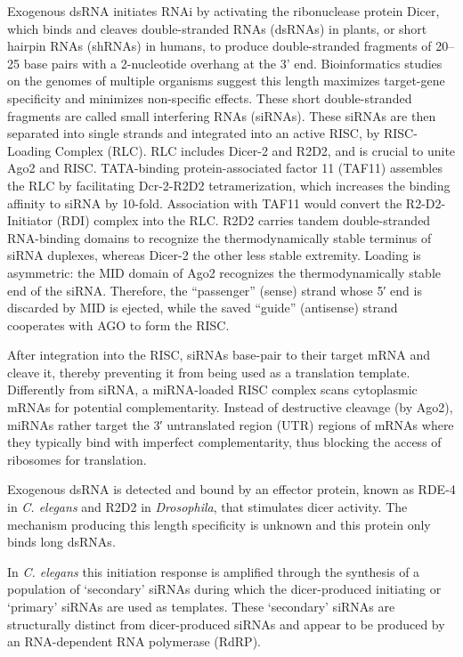 Exogenous dsRNA initiates RNAi by activating the ribonuclease protein Dicer, which binds and cleaves double-stranded RNAs (dsRNAs) in plants, or short hairpin RNAs (shRNAs) in humans, to produce double-stranded fragments of 20--25 base pairs with a 2-nucleotide overhang at the 3' end. Bioinformatics studies on the genomes of multiple organisms suggest this length maximizes target-gene specificity and minimizes non-specific effects. These short double-stranded fragments are called small interfering RNAs (siRNAs). These siRNAs are then separated into single strands and integrated into an active RISC, by RISC-Loading Complex (RLC). RLC includes Dicer-2 and R2D2, and is crucial to unite Ago2 and RISC. TATA-binding protein-associated factor 11 (TAF11) assembles the RLC by facilitating Dcr-2-R2D2 tetramerization, which increases the binding affinity to siRNA by 10-fold. Association with TAF11 would convert the R2-D2-Initiator (RDI) complex into the RLC. R2D2 carries tandem double-stranded RNA-binding domains to recognize the thermodynamically stable terminus of siRNA duplexes, whereas Dicer-2 the other less stable extremity. Loading is asymmetric: the MID domain of Ago2 recognizes the thermodynamically stable end of the siRNA. Therefore, the ``passenger'' (sense) strand whose 5′ end is discarded by MID is ejected, while the saved ``guide'' (antisense) strand cooperates with AGO to form the RISC.

After integration into the RISC, siRNAs base-pair to their target mRNA and cleave it, thereby preventing it from being used as a translation template. Differently from siRNA, a miRNA-loaded RISC complex scans cytoplasmic mRNAs for potential complementarity. Instead of destructive cleavage (by Ago2), miRNAs rather target the 3′ untranslated region (UTR) regions of mRNAs where they typically bind with imperfect complementarity, thus blocking the access of ribosomes for translation.

Exogenous dsRNA is detected and bound by an effector protein, known as RDE-4 in \emph{C. elegans} and R2D2 in \emph{Drosophila}, that stimulates dicer activity. The mechanism producing this length specificity is unknown and this protein only binds long dsRNAs.

In \emph{C. elegans} this initiation response is amplified through the synthesis of a population of `secondary' siRNAs during which the dicer-produced initiating or `primary' siRNAs are used as templates. These `secondary' siRNAs are structurally distinct from dicer-produced siRNAs and appear to be produced by an RNA-dependent RNA polymerase (RdRP).

